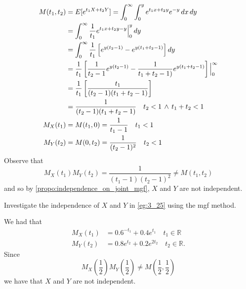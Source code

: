 \documentclass[notoc,notitlepage]{tufte-book}
\begin{document}
\begin{solution}
  \begin{align*}
    M(t_1, t_2) &= E[ e^{t_1 X + t_2 Y} ] = \int_{0}^{\infty} \int_{0}^{y} e^{t_1 x + t_2 y} e^{-y} \mathop{}\!d{x} \mathop{}\!d{y} \\
      &= \int_{0}^{\infty} \frac{1}{t_1}e^{t_1 x + t_2 y - y} \Big|_{0}^{y} \mathop{}\!d{y} \\
      &= \int_{0}^{\infty} \frac{1}{t_1} \left[e^{y(t_2 - 1)} - e^{y( t_1 + t_2 - 1 )}\right] \mathop{}\!d{y} \\
      &= \frac{1}{t_1} \left[ \frac{1}{t_2 - 1}e^{y(t_2 - 1)} - \frac{1}{t_1 + t_2 - 1)} e^{y(t_1 + t_2 - 1)} \right] \Big|_{0}^{\infty} \\
      &= \frac{1}{t_1} \left[ \frac{t_1}{(t_2 - 1) (t_1 + t_2 - 1)} \right] \\
      &= \frac{1}{(t_2 - 1)(t_1 + t_2 - 1)} \quad t_2 < 1 \, \land \, t_1 + t_2 < 1 \\
    M_X(t_1) &= M(t_1, 0) = \frac{1}{t_1 - 1} \quad t_1 < 1 \\
    M_Y(t_2) &= M(0, t_2) = \frac{1}{(t_2 - 1)^2} \quad t_2 < 1
  \end{align*}
  Observe that
  \begin{equation*}
    M_X(t_1) M_Y(t_2) = \frac{1}{(t_1 - 1)(t_2 - 1)^2} \neq M(t_1, t_2)
  \end{equation*}
  and so by \cref{propo:independence_on_joint_mgf}, $X$ and $Y$ are not independent.
\end{solution}

\begin{eg}[Example 3.27]
  Investigate the independence of $X$ and $Y$ in \cref{eg:3_25} using the mgf method.
\end{eg}

\begin{solution}
  We had that
  \begin{align*}
    M_X(t_1) &= 0.6^{-t_1} + 0.4e^{t_1} \quad t_1 \in \mathbb{R} \\
    M_Y(t_2) &= 0.8e^{t_2} + 0.2 e^{2t_2} \quad t_2 \in \mathbb{R}.
  \end{align*}
  Since
  \begin{equation*}
    M_X \left( \frac{1}{2} \right) M_Y\left( \frac{1}{2} \right) \neq M\left( \frac{1}{2}, \frac{1}{2} \right)
  \end{equation*}
  we have that $X$ and $Y$ are not independent.
\end{solution}

\end{document}
